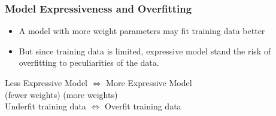 \documentclass{beamer}
\newcommand{\bi}{\begin{itemize}}
\newcommand{\ei}{\end{itemize}}
\begin{document}
\begin{frame}
\frametitle{Model Expressiveness and Overfitting}
\bi
\item A model with more weight parameters may fit training data better
\item But since training data is limited, expressive model stand the risk of overfitting to peculiarities of the data.
\ei
\begin{center}
Less Expressive Model $\Longleftrightarrow$ More Expressive Model \\
(fewer weights) \hspace{1cm} (more weights) \\[0.5cm]
Underfit training data $\Longleftrightarrow$ Overfit training data \\
\end{center}
\end{frame}
\end{document}
